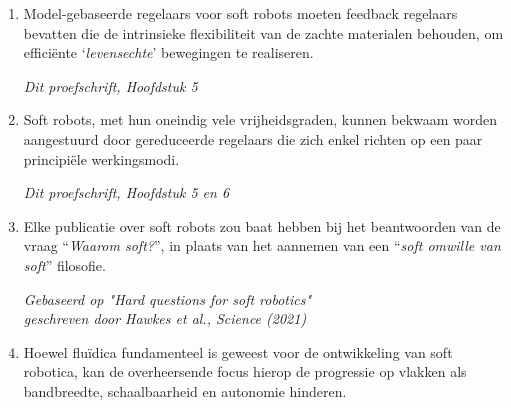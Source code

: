 \documentclass[a5paper]{article}
\begin{document}
\begin{enumerate}
\item Model-gebaseerde regelaars voor soft robots moeten feedback regelaars bevatten die de intrinsieke flexibiliteit van de zachte materialen behouden, om efficiënte `\textit{levensechte}' bewegingen te realiseren.
\begin{flushright}
\vspace{-2mm}
\textit{Dit proefschrift, Hoofdstuk 5}
\vspace{-1mm}
\end{flushright}

\item Soft robots, met hun oneindig vele vrijheidsgraden, kunnen bekwaam worden aangestuurd door gereduceerde regelaars die zich enkel richten op een paar principiële werkingsmodi.
\begin{flushright}
\vspace{-2mm}
\textit{Dit proefschrift, Hoofdstuk 5 en 6}
\vspace{-1mm}
\end{flushright}  

\item Elke publicatie over soft robots zou baat hebben bij het beantwoorden van de vraag ``\textit{Waarom soft?}'', in plaats van het aannemen van een ``\textit{soft omwille van soft}'' filosofie.
%  
\begin{flushright}
\vspace{-2mm}
\textit{Gebaseerd op "Hard questions for soft robotics" \\ geschreven door Hawkes et al., Science (2021)}
\vspace{-1mm}
\end{flushright}  

\item Hoewel fluïdica fundamenteel is geweest voor de ontwikkeling van soft robotica, kan de overheersende focus hierop de progressie op vlakken als bandbreedte, schaalbaarheid en autonomie hinderen.


\end{enumerate}
\end{document}
